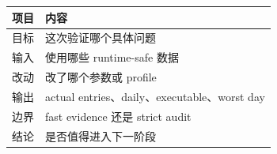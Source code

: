 \begin{longtable}{p{}p{}}
\toprule
项目 & 内容 \\
\midrule
目标 & 这次验证哪个具体问题 \\
输入 & 使用哪些 runtime-safe 数据 \\
改动 & 改了哪个参数或 profile \\
输出 & actual entries、daily、executable、worst day \\
边界 & fast evidence 还是 strict audit \\
结论 & 是否值得进入下一阶段 \\
\bottomrule
\end{longtable}


